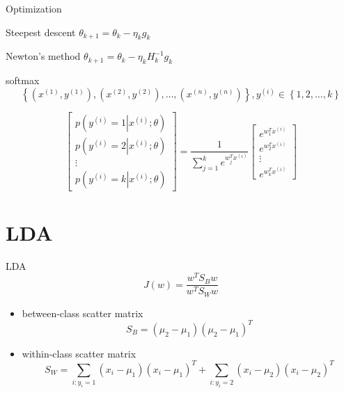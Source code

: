 \documentclass[xetex,mathserif,serif]{beamer}
\begin{document}
\begin{frame}{Optimization}
    \begin{block}{Steepest descent}
    ${\theta _{k + 1}} = {\theta _k} - {\eta _k}{g_k}$
    \end{block}

    \begin{block}{Newton's method}
    ${\theta _{k + 1}} = {\theta _k} - {\eta _k}H_k^{ - 1}{g_k}$
    \end{block}
\end{frame}

\begin{frame}{softmax}
    \[\left\{ {\left( {{x^{\left( 1 \right)}},{y^{\left( 1 \right)}}} \right),\left( {{x^{\left( 2 \right)}},{y^{\left( 2 \right)}}} \right), \ldots ,\left( {{x^{\left( n \right)}},{y^{\left( n \right)}}} \right)} \right\},{y^{\left( i \right)}} \in \left\{ {1,2, \ldots ,k} \right\}\]

    \[\left[ {\begin{array}{*{20}{c}}
    {p\left( {{y^{\left( i \right)}} = 1\left| {{x^{\left( i \right)}};\theta } \right.} \right)}\\
    {p\left( {{y^{\left( i \right)}} = 2\left| {{x^{\left( i \right)}};\theta } \right.} \right)}\\
     \vdots \\
    {p\left( {{y^{\left( i \right)}} = k\left| {{x^{\left( i \right)}};\theta } \right.} \right)}
    \end{array}} \right] = \frac{1}{{\sum\limits_{j = 1}^k {{e^{w_j^T{x^{\left( i \right)}}}}} }}\left[ {\begin{array}{*{20}{c}}
    {{e^{w_1^T{x^{\left( i \right)}}}}}\\
    {{e^{w_2^T{x^{\left( i \right)}}}}}\\
     \vdots \\
    {{e^{w_k^T{x^{\left( i \right)}}}}}
    \end{array}} \right]\]
\end{frame}

\section{LDA}

\begin{frame}{LDA}
\[J\left( w \right) = \frac{{{w^T}{S_B}w}}{{{w^T}{S_W}w}}\]
\begin{itemize}
  \item between-class scatter matrix \[ S_B = (\mu_2 - \mu_1){(\mu_2 - \mu_1)}^T \]
  \item within-class scatter matrix \[{S_W} = \sum\limits_{i:{y_i} = 1} {\left( {{x_i} - {\mu _1}} \right){{\left( {{x_i} - {\mu _1}} \right)}^T}}  + \sum\limits_{i:{y_i} = 2} {\left( {{x_i} - {\mu _2}} \right){{\left( {{x_i} - {\mu _2}} \right)}^T}} \]
\end{itemize}
\end{frame}
\end{document}
